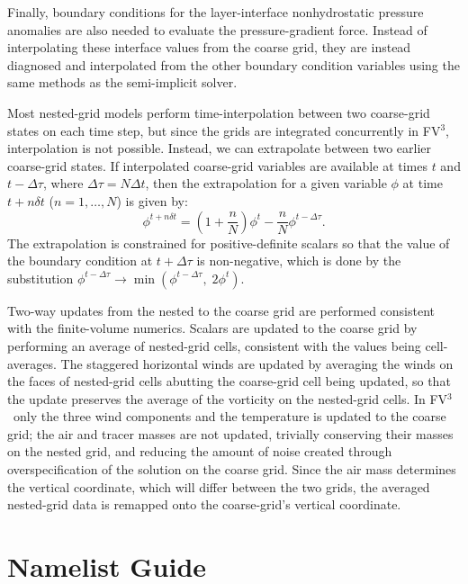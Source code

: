 \documentclass[12pt,letterpaper]{book}
\newcommand{\redtext}[1]{\textcolor{red}{[#1]}}  %
\newcommand{\fv}{FV$^{\mathrm{3}}$}
\begin{document}
Finally, boundary conditions for the layer-interface nonhydrostatic pressure anomalies are also needed to evaluate the pressure-gradient force. Instead of interpolating these interface values from the coarse grid, they are instead diagnosed and interpolated from the other boundary condition variables using the same methods as the semi-implicit solver.

Most nested-grid models perform time-interpolation between two coarse-grid states on each time step, but since the grids are integrated concurrently in \fv, interpolation is not possible. Instead, we can extrapolate between two earlier coarse-grid states. If interpolated coarse-grid variables are available at times $t$ and $t - \Delta \tau$, where $\Delta \tau = N\Delta t$, then the extrapolation for a given variable $\phi$ at time $t+n\delta t$ ($n = 1, \ldots, N $) is given by:
\begin{equation}
		 \phi^{t+n\delta t} = \left ( 1 + \frac{n}{N} \right )\phi^{t} -   \frac{n}{N}\phi^{t-\Delta \tau}.
\end{equation}
The extrapolation is constrained for positive-definite scalars so that the value of the boundary condition at $t+\Delta \tau$ is non-negative, which is done by the substitution $\phi^{t-\Delta \tau} \rightarrow \min \left ( \phi^{t-\Delta \tau}, \; 2\phi^{t}\right )$.

Two-way updates from the nested to the coarse grid are performed consistent with the finite-volume numerics. Scalars are updated to the coarse grid by performing an average of nested-grid cells, consistent with the values being cell-averages. The staggered horizontal winds are updated by averaging the winds on the faces of nested-grid cells abutting the coarse-grid cell being updated, so that the update preserves the average of the vorticity on the nested-grid cells. 
 In \fv\ only the three wind components and the temperature is updated to the coarse grid; the air and tracer masses are not updated, trivially conserving their masses on the nested grid, and reducing the amount of noise created through overspecification of the solution on the coarse grid. Since the air mass determines the vertical coordinate, which will differ between the two grids, the averaged nested-grid data is remapped onto the coarse-grid's vertical coordinate.


\appendix

\chapter{Namelist Guide}
\end{document}
